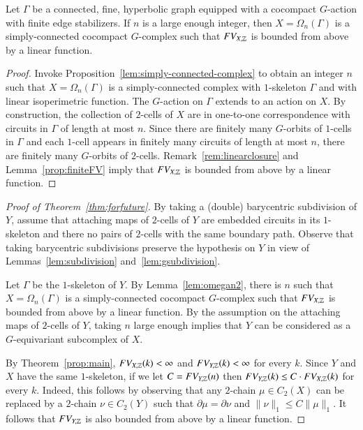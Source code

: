 \begin{lemma}\label{lem:omegan2}
Let $\Gamma$ be a connected, fine, hyperbolic graph  equipped with a cocompact $G$-action with finite edge stabilizers.  If $n$ is a large enough integer, then $X=\Omega_n(\Gamma)$ is a simply-connected cocompact $G$-complex such that $FV_{X, \mathbb{Z}}$ is bounded from above by a linear function.
\end{lemma}
\begin{proof}
Invoke Proposition~\ref{lem:simply-connected-complex} to obtain an integer $n$ such that   $X=\Omega_n(\Gamma)$ is a simply-connected complex with $1$-skeleton $\Gamma$ and with  linear isoperimetric function. The $G$-action on $\Gamma$ extends to an action on $X$.  By construction,  the collection of $2$-cells of $X$ are in one-to-one correspondence with circuits in $\Gamma$ of length at most $n$. Since there are finitely many $G$-orbits of $1$-cells in $\Gamma$ and each $1$-cell appears in finitely many circuits of length at most $n$, there are finitely many $G$-orbits of $2$-cells. Remark~\ref{rem:linearclosure} and Lemma~\ref{prop:finiteFV} imply that $FV_{X, \mathbb{Z}}$ is bounded from above by a linear function.
\end{proof}

\begin{proof}[Proof of Theorem~\ref{thm:forfuture}]
By taking a (double) barycentric subdivision of $Y$, assume that attaching maps of $2$-cells of $Y$ are embedded circuits in its $1$-skeleton and there no pairs of $2$-cells with the same boundary path. Observe that taking barycentric subdivisions preserve the hypothesis on $Y$ in view of Lemmas~\ref{lem:subdivision}  and~\ref{lem:gsubdivision}. 

Let $\Gamma$ be the $1$-skeleton of $Y$.  By Lemma~\ref{lem:omegan2}, there is  $n$ such that $X=\Omega_n(\Gamma)$ is a simply-connected cocompact $G$-complex such that $FV_{X, \mathbb{Z}}$ is bounded from above by a linear function. By the assumption on the attaching maps of $2$-cells of $Y$,  taking $n$ large enough implies that $Y$ can be considered as a $G$-equivariant subcomplex of $X$.  

By Theorem~\ref{prop:main}, $FV_{X, \mathbb{Z}}(k)<\infty$ and $FV_{Y, \mathbb{Z}}(k)<\infty$ for every $k$. 
Since $Y$ and $X$ have the same $1$-skeleton, if we let $C=FV_{Y,\mathbb{Z}}(n)$ then  $FV_{Y,\mathbb{Z}}(k) \leq C\cdot FV_{X,\mathbb{Z}}(k)$ for every $k$. Indeed, this follows by observing that any $2$-chain $\mu \in C_2(X)$ can be replaced by a $2$-chain $\nu \in C_2(Y)$ such that $\partial \mu =\partial \nu$ and $\|\nu\|_1 \leq C\|\mu\|_1$.  It follows that $FV_{Y, \mathbb{Z}}$ is also  bounded from above by a linear function.
\end{proof}




